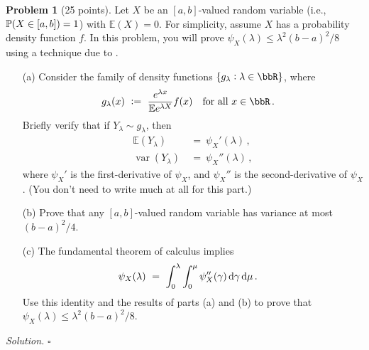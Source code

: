 \documentclass[11pt]{article}
\newcommand{\E}{\ensuremath{\mathbb{E}}} %
\renewcommand{\P}{\ensuremath{\mathbb{P}}} %
\newcommand{\var}{\ensuremath{\operatorname{var}}} %
\newcommand{\logmgf}[1]{\ensuremath{\psi_{#1}}} %
\theoremstyle{definition}
\newtheorem{problem}{Problem}
\newenvironment{solution}{\noindent\emph{Solution.}}{\hfill$\square$}
\begin{document}
\begin{problem}[25 points]
  Let $X$ be an $[a,b]$-valued random variable (i.e., $\P(X\in\intcc{a,b})=1$) with $\E(X) = 0$.
  For simplicity, assume $X$ has a probability density function $f$.
  In this problem, you will prove $\logmgf{X}(\lambda) \leq \lambda^2(b-a)^2/8$ using a technique due to \citet{McAllesterO03}.
  \begin{enumerate}
    \item[(a)]
      Consider the family of density functions $\{ g_\lambda : \lambda \in \bbR \}$, where
      \begin{align*}
        g_\lambda(x) & \ := \ \frac{e^{\lambda x}}{\E e^{\lambda X}} f(x)
        \quad \text{for all $x \in \bbR$} \,.
      \end{align*}
      Briefly verify that if $Y_\lambda \sim g_\lambda$, then
      \begin{align*}
        \E(Y_\lambda) & \ = \ \logmgf{X}'(\lambda)
        \,,
        \\
        \var(Y_\lambda) & \ = \ \logmgf{X}''(\lambda)
        \,,
      \end{align*}
      where $\logmgf{X}'$ is the first-derivative of $\logmgf{X}$, and $\logmgf{X}''$ is the second-derivative of $\logmgf{X}$.
      (You don't need to write much at all for this part.)

    \item[(b)]
      Prove that any $[a,b]$-valued random variable has variance at most $(b-a)^2/4$.

    \item[(c)]
      The fundamental theorem of calculus implies
      \begin{align*}
        \logmgf{X}(\lambda)
        & \ = \
        \int_0^\lambda \int_0^\mu \logmgf{X}''(\gamma) \dif\gamma \dif\mu
        \,.
      \end{align*}
      Use this identity and the results of parts (a) and (b) to prove that
      $\logmgf{X}(\lambda) \leq \lambda^2 (b-a)^2/8$.

  \end{enumerate}
\end{problem}

\begin{solution}
\end{solution}

\newpage

\end{document}

